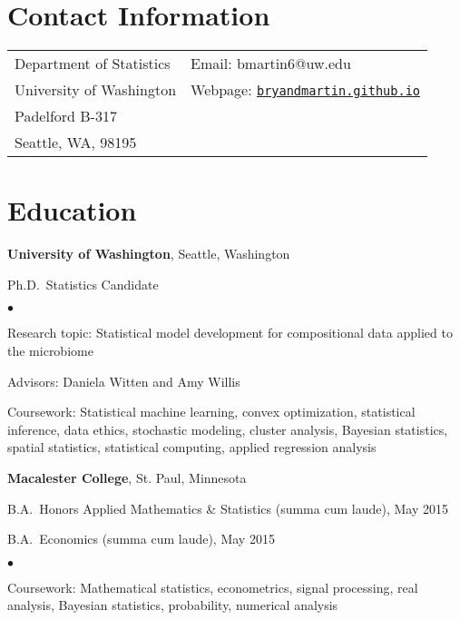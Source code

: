 \documentclass[margin,centered]{res}
\newenvironment{list1}{
  \begin{list}{\ding{113}}{%
      \setlength{\itemsep}{0in}
      \setlength{\parsep}{0in} \setlength{\parskip}{0in}
      \setlength{\topsep}{0in} \setlength{\partopsep}{0in}
      \setlength{\leftmargin}{0.17in}}}{\end{list}}
\newenvironment{list2}{
  \begin{list}{$\bullet$}{%
      \setlength{\itemsep}{0in}
      \setlength{\parsep}{0in} \setlength{\parskip}{0in}
      \setlength{\topsep}{0in} \setlength{\partopsep}{0in}
      \setlength{\leftmargin}{0.2in}}}{\end{list}}
\begin{document}
\vspace*{.1in}


\begin{resume}

\section{\sc Contact Information}

\vspace{.05in}
\begin{tabular}{@{}p{2.0in}p{2.9in}}
Department of Statistics& Email:  bmartin6@uw.edu \\
University of Washington  &Webpage: \href{https://bryandmartin.github.io/}{\texttt{bryandmartin.github.io}}
\\
Padelford B-317		                   	   \\
Seattle, WA, 98195             & \\






\end{tabular}

\section{\sc Education}
{\bf University of Washington}, Seattle, Washington
\begin{list1}
\item[] 
Ph.D.~Statistics Candidate
\begin{list2}
\vspace*{.05in}
\item Research topic: Statistical model development for compositional data applied to the microbiome
\item Advisors: Daniela Witten and Amy Willis
\item Coursework: Statistical machine learning, convex optimization, statistical inference, data ethics, stochastic modeling, cluster analysis, Bayesian statistics, spatial statistics, statistical computing, applied regression analysis
\end{list2}
\end{list1}



{\bf Macalester College}, St. Paul, Minnesota
\begin{list1}
\item[] B.A.~Honors Applied Mathematics \& Statistics (summa cum laude), May 2015
\item[] B.A.~Economics (summa cum laude), May 2015
\begin{list2}
\vspace*{.05in}
\item Coursework: Mathematical statistics, econometrics, signal processing, real analysis, Bayesian statistics, probability, numerical analysis
\end{list2}
\end{list1}



\end{resume}
\end{document}
